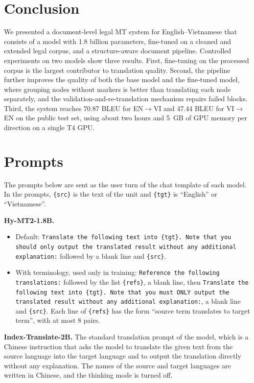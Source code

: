\documentclass[conference]{IEEEtran}
\newcommand{\envi}{EN$\rightarrow$VI}
\newcommand{\vien}{VI$\rightarrow$EN}
\begin{document}
\section{Conclusion}
We presented a document-level legal MT system for English--Vietnamese that consists of a model with 1.8 billion parameters, fine-tuned on a cleaned and extended legal corpus, and a structure-aware document pipeline. Controlled experiments on two models show three results. First, fine-tuning on the processed corpus is the largest contributor to translation quality. Second, the pipeline further improves the quality of both the base model and the fine-tuned model, where grouping nodes without markers is better than translating each node separately, and the validation-and-re-translation mechanism repairs failed blocks. Third, the system reaches 70.87 BLEU for \envi{} and 47.44 BLEU for \vien{} on the public test set, using about two hours and 5~GB of GPU memory per direction on a single T4 GPU.

\appendices

\section{Prompts}\label{app:prompts}
The prompts below are sent as the user turn of the chat template of each model. In the prompts, \texttt{\{src\}} is the text of the unit and \texttt{\{tgt\}} is ``English'' or ``Vietnamese''.

\textbf{Hy-MT2-1.8B.}
\begin{itemize}\raggedright
\item Default: \texttt{Translate the following text into \{tgt\}. Note that you should only output the translated result without any additional explanation:} followed by a blank line and \texttt{\{src\}}.
\item With terminology, used only in training: \texttt{Reference the following translations:} followed by the list \texttt{\{refs\}}, a blank line, then \texttt{Translate the following text into \{tgt\}. Note that you must ONLY output the translated result without any additional explanation:}, a blank line and \texttt{\{src\}}. Each line of \texttt{\{refs\}} has the form ``source term translates to target term'', with at most 8 pairs.
\end{itemize}

\textbf{Index-Translate-2B.} The standard translation prompt of the model, which is a Chinese instruction that asks the model to translate the given text from the source language into the target language and to output the translation directly without any explanation. The names of the source and target languages are written in Chinese, and the thinking mode is turned off.
\end{document}
